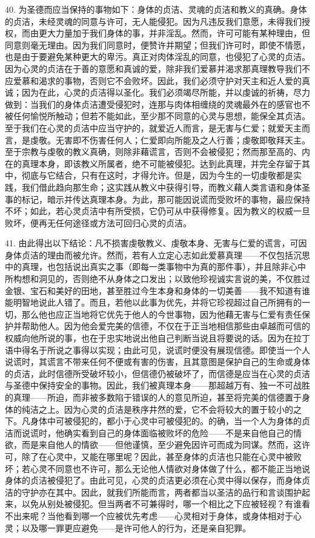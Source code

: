 40. 为圣德而应当保持的事物如下：身体的贞洁、灵魂的贞洁和教义的真确。身体的贞洁，未经灵魂的同意与许可，无人能侵犯。因为凡违反我们意愿，未得我们授权，而由更大力量加于我们身体的事，并非淫乱。然而，许可可能有某种理由，但同意则毫无理由。因为我们同意时，便赞许并期望；但我们许可时，即使不情愿，也是由于要避免某种更大的卑污。真正对肉体淫乱的同意，也侵犯了心灵的贞洁。因为心灵的贞洁在于善的意愿和真诚的爱，除非我们爱慕并渴求那真理教导我们不应爱慕和渴求的事物，否则它不会败坏。因此，我们必须守护对天主和近人爱的真诚；因为在此，心灵的贞洁得以圣化。我们必须竭尽所能，并以虔诚的祈祷，尽力做到：当我们的身体贞洁遭受侵犯时，连那与肉体相缠绕的灵魂最外在的感官也不被任何愉悦所触动；但若不能如此，至少那不同意的心灵与思想，能保全其贞洁。至于我们在心灵的贞洁中应当守护的，就爱近人而言，是无害与仁爱；就爱天主而言，是虔敬。无害即不伤害任何人；仁爱即向所能及之人行善；虔敬即敬拜天主。至于宗教与虔敬的教义真确，则除非藉谎言，否则不会被侵犯；然而那至高的、内在的真理本身，即该教义所属者，绝不可能被侵犯。达到此真理，并完全存留于其中，彻底与它结合，只有在这时，才得允许。但是，因为今生的一切虔敬都是实践，我们借此趋向那生命；这实践从教义中获得引导，而教义藉人类言语和身体圣事的标记，暗示并传达真理本身。为此，那可能因说谎而受败坏的事物，最应保持不坏；如此，若心灵贞洁中有所受损，它仍可从中获得修复。因为教义的权威一旦败坏，便再无任何途径或方法可回归心灵的贞洁。\par

41. 由此得出以下结论：凡不损害虔敬教义、虔敬本身、无害与仁爱的谎言，可因身体贞洁的理由而被允许。然而，若有人立定心志如此爱慕真理——不仅包括沉思中的真理，也包括说出真实之事（即每一类事物中为真的那件事），并且除非心中所构想和洞见的，否则绝不从身体之口发出；以致他珍视诚实言说的美，不仅胜过金银、宝石和美好的田地，甚至胜过今生本身和身体的一切美善——我不知道有谁能明智地说此人错了。而且，若他以此事为优先，并将它珍视超过自己所拥有的一切，那么他也应正当地将它优先于他人的今世事物，因为他藉无害与仁爱有责任保护并帮助他人。因为他会爱完美的信德，不仅在于正当地相信那些由卓越而可信的权威向他所说的事，也在于忠实地说出他自己判断当说且将要说的话。因为在拉丁语中得名于所说之事得以实现；由此可见，说谎时便没有展现信德。即使当一个人说谎时，其谎言不带来任何不便或有害的伤害，且其意图是保护自己的生命或身体的贞洁，此时信德所受破坏较小，但信德仍被破坏了，而信德是应当在心灵的贞洁与圣德中保持安全的事物。因此，我们被真理本身——那超越万有、独一不可战胜的真理——所迫，而非被多数陷于错误的人的意见所迫，甚至将完美的信德置于身体的纯洁之上。因为心灵的贞洁是秩序井然的爱，它不会将较大的置于较小的之下。凡身体中可被侵犯的，都小于心灵中可被侵犯的。的确，当一个人为身体的贞洁而说谎时，他确实看到自己的身体面临被败坏的危险——不是来自他自己的情欲，而是来自他人的情欲——但他谨慎，至少避免因许可而成为同谋。然而，这许可，除了在心灵中，又能在哪里呢？因此，甚至身体的贞洁也只能在心灵中被败坏；若心灵不同意也不许可，那么无论他人情欲对身体做了什么，都不能正当地说身体的贞洁被侵犯了。由此可见，心灵的贞洁更必须在心灵中得以保存，而身体贞洁的守护亦在其中。因此，就我们所能而言，两者都当以圣洁的品行和言谈围护起来，以免从别处被侵犯。但当两者不可兼得时，哪一个相比之下应被轻视？有谁看不出来呢？当他看到哪一个应被优先考虑——心灵相对于身体，或身体相对于心灵；以及哪一罪更应避免——是许可他人的行为，还是亲自犯罪。\par

